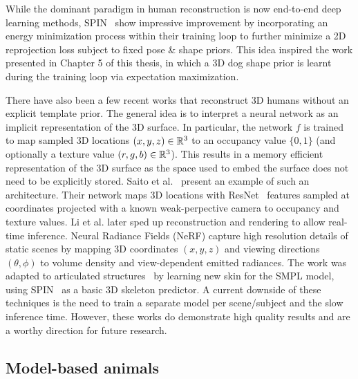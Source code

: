     While the dominant paradigm in human reconstruction is now end-to-end deep learning methods, SPIN~\cite{kolotouros19learning} show impressive improvement by incorporating an energy minimization process within their training loop to further minimize a 2D reprojection loss subject to fixed pose \& shape priors. This idea inspired the work presented in Chapter 5 of this thesis, in which a 3D dog shape prior is learnt during the training loop via expectation maximization.

    
    There have also been a few recent works that reconstruct 3D humans without an explicit template prior. The general idea is to interpret a neural network as an implicit representation of the 3D surface. In particular, the network $f$ is trained to map sampled 3D locations $(x,y,z) \in {\mathbb{R}^{3}}$ to an occupancy value $\{0,1\}$ (and optionally a texture value $(r,g,b) \in {\mathbb{R}^{3}}$). This results in a memory efficient representation of the 3D surface as the space used to embed the surface does not need to be explicitly stored. Saito et al.~\cite{pifuSHNMKL19,saito2020pifuhd} present an example of such an architecture. Their network maps 3D locations with ResNet~ features sampled at coordinates projected with a known weak-perpective camera to occupancy and texture values. Li et al. later sped up reconstruction and rendering to allow real-time inference. Neural Radiance Fields (NeRF) capture high resolution details of static scenes by mapping 3D coordinates $(x,y,z)$ and viewing directions $(\theta, \phi)$ to volume density and view-dependent emitted radiances. The work was adapted to articulated structures~ by learning new skin for the SMPL model, using SPIN~\cite{kolotouros19learning} as a basic 3D skeleton predictor. A current downside of these techniques is the need to train a separate model per scene/subject and the slow inference time. However, these works do demonstrate high quality results and are a worthy direction for future research.


\subsection{Model-based animals}

